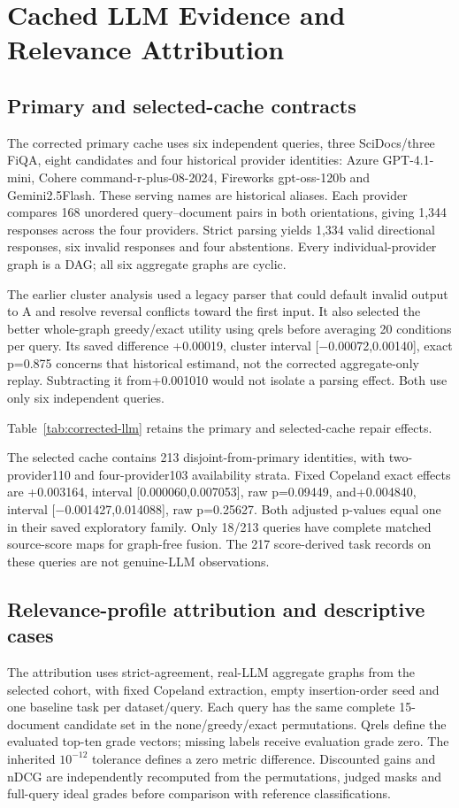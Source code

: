 \documentclass[pdflatex,sn-basic,Numbered]{sn-jnl}
\begin{document}
\section{Cached LLM Evidence and Relevance Attribution}\label{sec:si-cached}
\subsection{Primary and selected-cache contracts}
The corrected primary cache uses six independent queries, three SciDocs/three FiQA, eight candidates and four historical provider identities: Azure GPT-4.1-mini, Cohere command-r-plus-08-2024, Fireworks gpt-oss-120b and Gemini2.5Flash. These serving names are historical aliases. Each provider compares 168 unordered query--document pairs in both orientations, giving 1,344 responses across the four providers. Strict parsing yields 1,334 valid directional responses, six invalid responses and four abstentions. Every individual-provider graph is a DAG; all six aggregate graphs are cyclic.

The earlier cluster analysis used a legacy parser that could default invalid output to A and resolve reversal conflicts toward the first input. It also selected the better whole-graph greedy/exact utility using qrels before averaging 20 conditions per query. Its saved difference +0.00019, cluster interval [−0.00072,0.00140], exact p=0.875 concerns that historical estimand, not the corrected aggregate-only replay. Subtracting it from+0.001010 would not isolate a parsing effect. Both use only six independent queries.

Table~\ref{tab:corrected-llm} retains the primary and selected-cache repair effects.

The selected cache contains 213 disjoint-from-primary identities, with two-provider110 and four-provider103 availability strata. Fixed Copeland exact effects are +0.003164, interval [0.000060,0.007053], raw p=0.09449, and+0.004840, interval [−0.001427,0.014088], raw p=0.25627. Both adjusted p-values equal one in their saved exploratory family. Only 18/213 queries have complete matched source-score maps for graph-free fusion. The 217 score-derived task records on these queries are not genuine-LLM observations.

\subsection{Relevance-profile attribution and descriptive cases}
The attribution uses strict-agreement, real-LLM aggregate graphs from the selected cohort, with fixed Copeland extraction, empty insertion-order seed and one baseline task per dataset/query. Each query has the same complete 15-document candidate set in the none/greedy/exact permutations. Qrels define the evaluated top-ten grade vectors; missing labels receive evaluation grade zero. The inherited $10^{-12}$ tolerance defines a zero metric difference. Discounted gains and nDCG are independently recomputed from the permutations, judged masks and full-query ideal grades before comparison with reference classifications.
\end{document}

